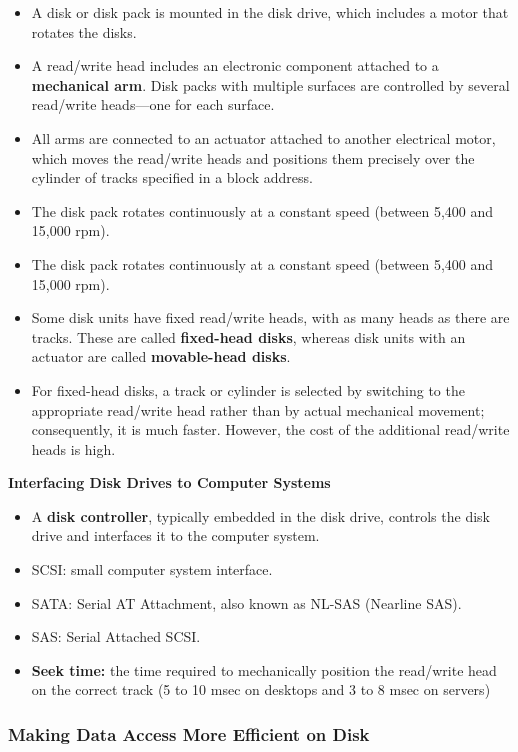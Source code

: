 \documentclass[10pt]{article}
\newcommand{\tf}{\textbf}
\begin{document}
\begin{itemize}
	\item A disk or disk pack is mounted in the disk drive, which includes a motor that rotates the disks. 
	\item A read/write head includes an electronic component attached to a \tf{mechanical arm}. Disk packs with multiple surfaces are controlled by several read/write heads—one for each surface.
	\item All arms are connected to an actuator attached to another electrical motor, which moves the read/write heads and positions them precisely over the cylinder of tracks specified in a block address. 
	\item The disk pack rotates continuously at a constant speed (between 5,400 and 15,000 rpm). 
	\item The disk pack rotates continuously at a constant speed (between 5,400 and 15,000 rpm). 
	\item Some disk units have fixed read/write heads, with as many heads as there are tracks. These are called \tf{fixed-head disks}, whereas disk units with an actuator are called \tf{movable-head disks}.
	\item For fixed-head disks, a track or cylinder is selected by switching to the appropriate read/write head rather than by actual mechanical movement; consequently, it is much faster. However, the cost of the additional read/write heads is high. 
\end{itemize}

\tf{Interfacing Disk Drives to Computer Systems}

\begin{itemize}
	\item A \tf{disk controller}, typically embedded in the disk drive, controls the disk drive and interfaces it to the computer
	system.
	\item SCSI: small computer system interface.
	\item SATA: Serial AT Attachment, also known as NL-SAS (Nearline SAS).
	\item SAS: Serial Attached SCSI.
	\item \tf{Seek time:} the time required to mechanically position the read/write head on the correct track (5 to 10 msec on desktops and 3 to 8 msec on servers)
\end{itemize}

\subsubsection{Making Data Access More Efficient on Disk}
\end{document}

